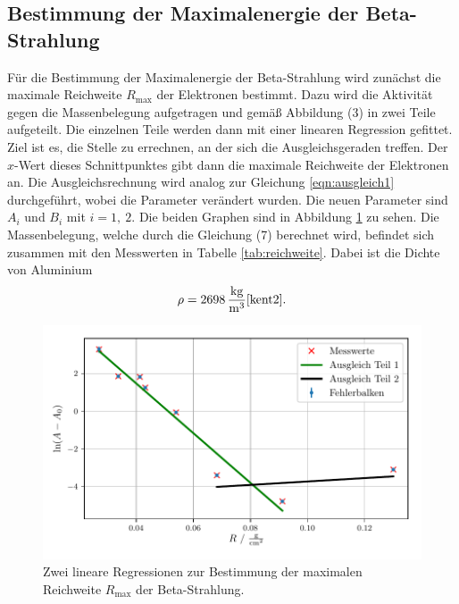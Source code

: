 \subsection{Bestimmung der Maximalenergie der Beta-Strahlung}
Für die Bestimmung der Maximalenergie der Beta-Strahlung wird zunächst die maximale Reichweite $R_\text{max}$ der Elektronen bestimmt.
Dazu wird die Aktivität gegen die Massenbelegung aufgetragen und gemäß Abbildung (3) in zwei Teile aufgeteilt. Die einzelnen Teile
werden dann mit einer linearen Regression gefittet. Ziel ist es, die Stelle zu errechnen, an der sich die Ausgleichsgeraden treffen. Der $x$-Wert dieses
Schnittpunktes gibt dann die maximale Reichweite der Elektronen an. Die Ausgleichsrechnung wird analog zur Gleichung \eqref{eqn:ausgleich1} durchgeführt, wobei
die Parameter verändert wurden. Die neuen Parameter sind $A_i$ und $B_i$ mit $i=1,\: 2$. Die beiden Graphen sind in Abbildung \ref{fig:reichweite} zu sehen.
Die Massenbelegung, welche durch die Gleichung (7) berechnet wird, befindet sich zusammen mit den Messwerten in Tabelle \ref{tab:reichweite}.
Dabei ist die Dichte von Aluminium
\begin{align*}
\rho = 2698\,\frac{\si{\kilo\gram}}{\si{\cubic\meter}} \text{\cite{kent2}}.
\end{align*}
\begin{figure}[H]
  \center
  \includegraphics[scale = 0.75]{beta.pdf}
  \caption{Zwei lineare Regressionen zur Bestimmung der maximalen Reichweite $R_\text{max}$ der Beta-Strahlung.}
  \label{fig:reichweite}
\end{figure}

